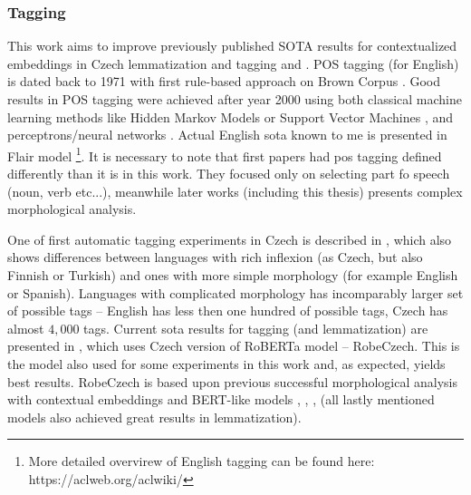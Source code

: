 \subsubsection{Tagging}
This work aims to improve previously published SOTA results for contextualized embeddings in Czech lemmatization and tagging \citep{straka2019czech} and \citep{Straka2021}. POS tagging (for English) is dated back to 1971 with first rule-based approach on Brown Corpus \citep{greene1971automatic}. Good results in POS tagging were achieved after year 2000 using both classical machine learning methods like Hidden Markov Models \citep{tnt} or Support Vector Machines \citep{svmtool}, and perceptrons/neural networks \citep{collins-2002-discriminative}. Actual English \acrlong{sota} known to me is presented in Flair model \citep{Akbik2018}\footnote{More detailed overvirew of English tagging can be found here: https://aclweb.org/aclwiki/}. It is necessary to note that first papers had \acrshort{pos} tagging defined differently than it is in this work. They focused only on selecting part fo speech (noun, verb etc...), meanwhile later works (including this thesis) presents complex morphological analysis.
\par
One of first automatic tagging experiments in Czech is described in \citep{Hladka}, which also shows differences between languages with rich inflexion (as Czech,  but also Finnish or Turkish) and ones with more simple morphology (for example English or Spanish). Languages with complicated morphology has incomparably larger set of possible tags -- English has less then one hundred of possible tags, Czech has almost $4,000$ tags.  Current \acrshort{sota} results for tagging (and lemmatization) are presented in \citep{Straka2021}, which uses Czech version of RoBERTa model -- RobeCzech. This is the model also used for some experiments in this work and, as expected,  yields best results. RobeCzech is based upon previous successful morphological analysis with contextual embeddings and BERT-like models \citep{Straka2019b}, \citep{Straka2019a}, \citep{Straka2019}, \citep{Straka2018} (all lastly mentioned models also achieved great results in lemmatization). \par
